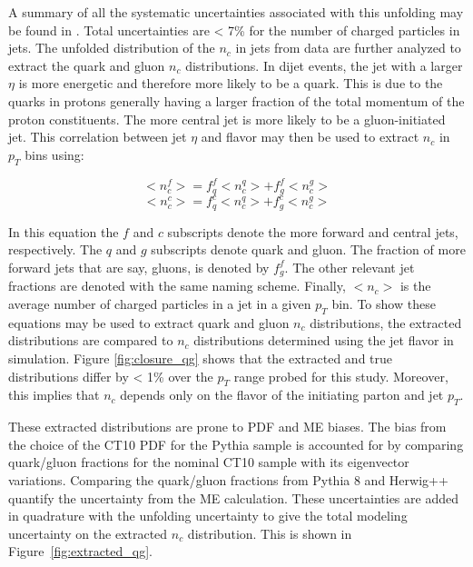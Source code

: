 A summary of all the systematic uncertainties associated with this unfolding may be found in \cite{Unfolding}. Total uncertainties are < 7\% for the number of charged particles in jets. The unfolded distribution of the $n_{c}$ in jets from data are further analyzed to extract the quark and gluon $n_{c}$ distributions. In dijet events, the jet with a larger $\eta$ is more energetic and therefore more likely to be a quark. This is due to the quarks in protons generally having a larger fraction of the total momentum of the proton constituents. The more central jet is more likely to be a gluon-initiated jet. This correlation between jet $\eta$ and flavor may then be used to extract $n_{c}$ in $p_{T}$ bins using:

\begin{equation}
<n_{c}^{f}> = f_{q}^{f}<n_{c}^{q}> + f^{f}_{g}<n_{c}^{g}>
\end{equation}
\begin{equation}
<n_{c}^{c}> = f_{q}^{c}<n_{c}^{q}> + f^{c}_{g}<n_{c}^{g}> 
\end{equation}


In this equation the $f$ and $c$ subscripts denote the more forward and central jets, respectively. The $q$ and $g$ subscripts denote quark and gluon. The fraction of more forward jets that are say, gluons, is denoted by $f_{g}^{f}$. The other relevant jet fractions are denoted with the same naming scheme. Finally, $<n_{c}>$ is the average number of charged particles in a jet in a given $p_{T}$ bin. To show these equations may be used to extract quark and gluon $n_{c}$ distributions, the extracted distributions are compared to $n_{c}$ distributions determined using the jet flavor in simulation. Figure \ref{fig:closure_qg} shows that the extracted and true distributions differ by < 1\% over the $p_{T}$ range probed for this study. Moreover, this implies that $n_{c}$ depends only on the flavor of the initiating parton and jet $p_{T}$. 

These extracted distributions are prone to PDF and ME biases. The bias from the choice of the CT10 PDF for the Pythia sample is accounted for by comparing quark/gluon fractions for the nominal CT10 sample with its eigenvector variations. Comparing the quark/gluon fractions from Pythia 8 and Herwig++ quantify the uncertainty from the ME calculation. These uncertainties are added in quadrature with the unfolding uncertainty to give the total modeling uncertainty on the extracted $n_{c}$ distribution. This is shown in Figure~\ref{fig:extracted_qg}.

